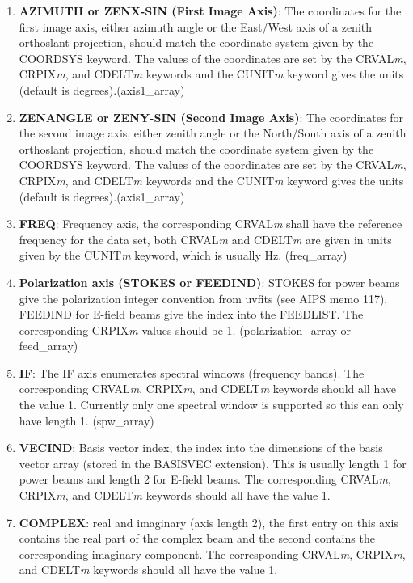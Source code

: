 \documentclass[11pt, oneside]{article}   	%
\begin{document}
\begin{enumerate}
\item{\textbf{AZIMUTH or ZENX-SIN (First Image Axis)}: The coordinates for the first image axis, either azimuth angle or the East/West axis of a zenith orthoslant projection, should match the coordinate system given by the COORDSYS keyword. The values of the coordinates are set by the CRVAL\textit{m}, CRPIX\textit{m}, and CDELT\textit{m} keywords and the CUNIT\textit{m} keyword gives the units (default is degrees).(axis1\_array)}
\item{\textbf{ZENANGLE or ZENY-SIN (Second Image Axis)}: The coordinates for the second image axis, either zenith angle or the North/South axis of a zenith orthoslant projection, should match the coordinate system given by the COORDSYS keyword. The values of the coordinates are set by the CRVAL\textit{m}, CRPIX\textit{m}, and CDELT\textit{m} keywords and the CUNIT\textit{m} keyword gives the units (default is degrees).(axis1\_array)}
\item{\textbf{FREQ}: Frequency axis, the corresponding CRVAL\textit{m} shall have the reference frequency for the data set, both CRVAL\textit{m} and CDELT\textit{m} are given in units given by the CUNIT\textit{m} keyword, which is usually Hz. (freq\_array)}
\item{\textbf{Polarization axis (STOKES or FEEDIND)}: STOKES for power beams give the polarization integer convention from uvfits (see AIPS memo 117), FEEDIND for E-field beams give the index into the FEEDLIST. The corresponding CRPIX\textit{m} values should be 1. (polarization\_array or feed\_array)}
\item{\textbf{IF}: The IF axis enumerates spectral windows (frequency bands). The corresponding CRVAL\textit{m}, CRPIX\textit{m}, and CDELT\textit{m} keywords should all have the value 1. Currently only one spectral window is supported so this can only have length 1. (spw\_array)}
\item{\textbf{VECIND}: Basis vector index, the index into the dimensions of the basis vector array (stored in the BASISVEC extension). This is usually length 1 for power beams and length 2 for E-field beams. The corresponding CRVAL\textit{m}, CRPIX\textit{m}, and CDELT\textit{m} keywords should all have the value 1.}
\item{\textbf{COMPLEX}: real and imaginary (axis length 2), the first entry on this axis contains the real part of the complex beam and the second contains the corresponding imaginary component. The corresponding CRVAL\textit{m}, CRPIX\textit{m}, and CDELT\textit{m} keywords should all have the value 1.}
\end{enumerate}
\end{document}
